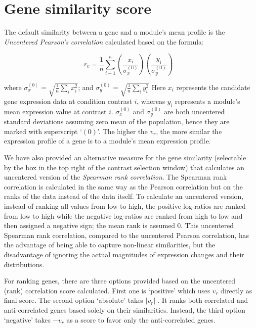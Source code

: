 \section{Gene similarity score}\label{apd:gene-score}

The default similarity between a gene and a module's mean
profile is the \textit{Uncentered Pearson’s correlation} calculated based
on the formula:

\begin{equation}
r_v=\frac{1}{n}\sum_{i-1}^n(\dfrac{x_i}{\sigma_x^{(0)}})(\dfrac{y_i}{\sigma_y^{(0)}})
\end{equation}

where $\textstyle\sigma_x^{(0)}=\sqrt{\frac{1}{n}\sum\limits_{i}x_i^2}$; and 
$\textstyle\sigma_y^{(0)}=\sqrt{\frac{1}{n}\sum\limits_{i}y_i^2}$
Here $x_i$ represents the candidate gene expression data at
condition contrast $i$, whereas $y_i$ represents a module’s mean
expression value at contrast $i$. $\sigma_x^{(0)}$ and
$\sigma_y^{(0)}$ are both uncentered standard deviations assuming
zero mean of the population, hence they are marked with
superscript ‘$(0)$’. The higher the $v_r$, the more similar the
expression profile of a gene is to a module’s mean expression
profile.

We have also provided an alternative measure for the gene
similarity (selectable by the box in the top right of the
contrast selection window) that calculates an uncentered version
of the \textit{Spearman rank correlation}. The Spearman rank correlation
is calculated in the same way as the Pearson correlation but on
the ranks of the data instead of the data itself. To calculate an
uncentered version, instead of ranking all values from low to
high, the positive log-ratios are ranked from low to high while
the negative log-ratios are ranked from high to low and then
assigned a negative sign; the mean rank is assumed $0$.  This
uncentered Spearman rank correlation, compared to the uncentered
Pearson correlation, has the advantage of being able to capture
non-linear similarities, but the disadvantage of ignoring the
actual magnitudes of expression changes and their distributions.

For ranking genes, there are three options provided based on the
uncentered (rank) correlation score calculated. First one is
‘positive’ which uses $v_r$ directly as final score.  The second
option ‘absolute’ takes $|v_r|$ . It ranks both correlated and
anti-correlated genes based solely on their similarities. Instead, 
the third option ‘negative’ takes $-v_r$ as a score to favor only 
the anti-correlated genes.



